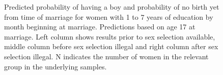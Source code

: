 \documentclass[12pt,letterpaper]{article}
\begin{document}
\begin{figure}[htpb]
{\begin{minipage}{0.31\textwidth}
\captionsetup[subfigure]{labelformat=parens}
\end{minipage}
}
\setcounter{subfigure}{3}
\caption{Predicted probability of having a boy and probability of
no birth yet from time of marriage for women with 1 to 7 years of education by month beginning at marriage. 
Predictions based on age 17 at marriage.
Left column shows results prior to sex selection available, middle column before
sex selection illegal and right column after sex selection illegal.
N indicates the number of women in the relevant group in the underlying samples.
}
\label{fig:results_spell1_med}
\end{figure}
\end{document}
